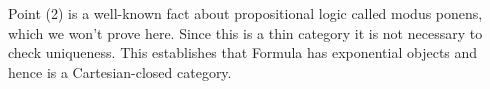 Point (2) is a well-known fact about propositional logic called 
modus ponens, which we won't prove here.
Since this is a thin category it is not necessary to check uniqueness.
This establishes that \textsf{Formula} has exponential objects and 
hence is a Cartesian-closed category.





